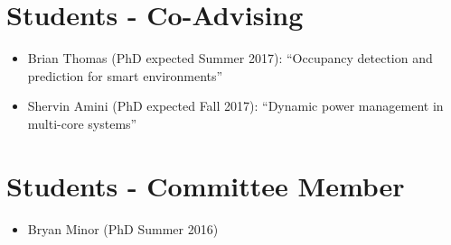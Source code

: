 \AOCLine
\section*{Students - Co-Advising}
\label{sec:students}

\begin{itemize}
	\item Brian Thomas (PhD expected Summer 2017): ``Occupancy detection and prediction for smart environments''
	\item Shervin Amini (PhD expected Fall 2017): ``Dynamic power management in multi-core systems''
\end{itemize}

\section*{Students - Committee Member}
\label{sec:students}

\begin{itemize}
	\item Bryan Minor (PhD Summer 2016)
\end{itemize}
